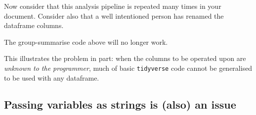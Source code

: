 \documentclass[]{book}
\newenvironment{Shaded}{}{}
\newcommand{\CharTok}[1]{\textcolor[rgb]{0.25,0.44,0.63}{#1}}
\newcommand{\CommentTok}[1]{\textcolor[rgb]{0.38,0.63,0.69}{\textit{#1}}}
\newcommand{\DataTypeTok}[1]{\textcolor[rgb]{0.56,0.13,0.00}{#1}}
\newcommand{\FloatTok}[1]{\textcolor[rgb]{0.25,0.63,0.44}{#1}}
\newcommand{\KeywordTok}[1]{\textcolor[rgb]{0.00,0.44,0.13}{\textbf{#1}}}
\newcommand{\NormalTok}[1]{#1}
\newcommand{\OperatorTok}[1]{\textcolor[rgb]{0.40,0.40,0.40}{#1}}
\newcommand{\StringTok}[1]{\textcolor[rgb]{0.25,0.44,0.63}{#1}}
\begin{document}
Now consider that this analysis pipeline is repeated many times in your document. Consider also that a well intentioned person has renamed the dataframe columns.

\begin{Shaded}
\end{Shaded}

The group-summarise code above will no longer work.

\begin{Shaded}
\end{Shaded}

This illustrates the problem in part: when the columns to be operated upon are \emph{unknown to the programmer}, much of basic \texttt{tidyverse} code cannot be generalised to be used with any dataframe.

\hypertarget{passing-variables-as-strings-is-also-an-issue}{%
\subsection{Passing variables as strings is (also) an issue}\label{passing-variables-as-strings-is-also-an-issue}}
\end{document}
